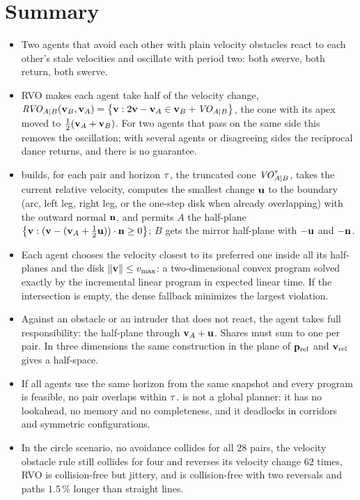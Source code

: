 \section{Summary}
\begin{summary}
\begin{itemize}
  \item Two agents that avoid each other with plain velocity obstacles
        react to each other's stale velocities and oscillate with period two:
        both swerve, both return, both swerve.
  \item RVO makes each agent take half of the velocity change,
        $\mathit{RVO}_{A|B}(\mathbf{v}_B, \mathbf{v}_A) = \left\{ \mathbf{v} : 2\mathbf{v} - \mathbf{v}_A \in \mathbf{v}_B + \mathit{VO}_{A|B} \right\}$,
        the cone with its apex moved to $\tfrac12(\mathbf{v}_A + \mathbf{v}_B)$. For two
        agents that pass on the same side this removes the oscillation; with
        several agents or disagreeing sides the reciprocal dance returns, and
        there is no guarantee.
  \item \orca builds, for each pair and horizon $\tau$, the truncated cone
        $\mathit{VO}^{\tau}_{A|B}$, takes the current relative velocity, computes the
        smallest change $\mathbf{u}$ to the boundary (arc, left leg, right leg,
        or the one-step disk when already overlapping) with the outward normal
        $\mathbf{n}$, and permits $A$ the half-plane
        $\left\{ \mathbf{v} : (\mathbf{v} - (\mathbf{v}_A + \tfrac12\mathbf{u}))\cdot\mathbf{n} \ge 0 \right\}$;
        $B$ gets the mirror half-plane with $-\mathbf{u}$ and $-\mathbf{n}$.
  \item Each agent chooses the velocity closest to its preferred one inside
        all its half-planes and the disk $\left\lVert \mathbf{v} \right\rVert \le v_{\max}$: a
        two-dimensional convex program solved exactly by the incremental
        linear program in expected linear time. If the intersection is empty,
        the dense fallback minimizes the largest violation.
  \item Against an obstacle or an intruder that does not react, the agent
        takes full responsibility: the half-plane through $\mathbf{v}_A + \mathbf{u}$.
        Shares must sum to one per pair. In three dimensions the same
        construction in the plane of $\mathbf{p}_{\mathrm{rel}}$ and
        $\mathbf{v}_{\mathrm{rel}}$ gives a half-space.
  \item If all agents use the same horizon from the same snapshot and every
        program is feasible, no pair overlaps within $\tau$. \orca is not a
        global planner: it has no lookahead, no memory and no completeness,
        and it deadlocks in corridors and symmetric configurations.
  \item In the circle scenario, no avoidance collides for all $28$ pairs,
        the velocity obstacle rule still collides for four and reverses its
        velocity change $62$ times, RVO is collision-free but jittery, and
        \orca is collision-free with two reversals and paths $1.5\,\%$ longer
        than straight lines.
\end{itemize}
\end{summary}

